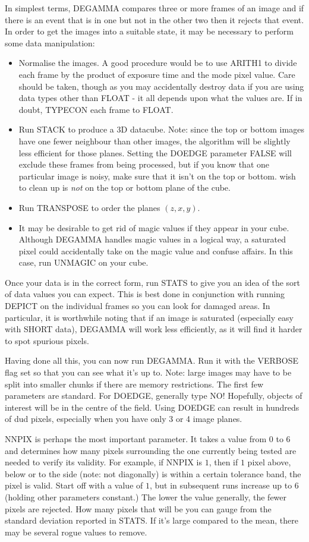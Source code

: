 In simplest terms, DEGAMMA compares three or more frames of an image and if
there is an event that is in one but not in the other two then it rejects that
event. In order to get the images into a suitable state, it may be necessary to
perform some data manipulation:
\begin{itemize}
\item Normalise the images. A good procedure would be to use ARITH1 to divide
each frame by the product of exposure time and the mode pixel value. Care
should be taken, though as you may accidentally destroy data if you are using
data types other than FLOAT - it all depends upon what the values are. If in
doubt, TYPECON each frame to FLOAT.
\item Run STACK to produce a 3D datacube. Note: since the top or bottom images
have one fewer neighbour than other images, the algorithm will be slightly less
efficient for those planes. Setting the DOEDGE parameter FALSE will exclude
these frames from
being processed, but if you know that one particular image is noisy, make sure
that it isn't on the top or bottom.
wish to clean up is {\em not} on the top or bottom plane of the cube.
\item Run TRANSPOSE to order the planes $(z,x,y)$.
\item It may be desirable to get rid of magic values if they appear in your
cube. Although DEGAMMA handles magic values in a logical way, a saturated pixel
could accidentally take on the magic value and confuse affairs. In this case,
run UNMAGIC on your cube.
\end{itemize}
Once your data is in the correct form, run STATS to give you an idea of the
sort of data values you can expect. This is best done in conjunction with
running DEPICT on the individual frames so you can look for damaged areas. In
particular, it is worthwhile noting that if an image is saturated (especially
easy with SHORT data), DEGAMMA will work less efficiently, as it will find it
harder to spot spurious pixels.

Having done all this, you can now run DEGAMMA. Run it with the VERBOSE flag set
so that you can see what it's up to. Note: large images may have to be split
into smaller chunks if there are memory restrictions. The first few parameters
are standard. For DOEDGE, generally type NO! Hopefully, objects of interest
will be in the centre of the field. Using DOEDGE can result in hundreds of dud
pixels, especially when you have only 3 or 4 image planes.

NNPIX is perhaps the most important parameter. It takes a value from $0$ to $6$
and determines how many pixels surrounding the one currently being tested are
needed to verify its validity. For example, if NNPIX is $1$, then if $1$ pixel
above, below or to the side (note: not diagonally) is within a certain
tolerance band, the pixel is valid. Start off with a value of $1$, but in
subsequent runs increase up to $6$ (holding other parameters constant.) The
lower the value generally, the fewer pixels are rejected. How many pixels that
will be you can gauge from the standard deviation reported in STATS. If it's
large compared to the mean, there may be several rogue values to remove.

